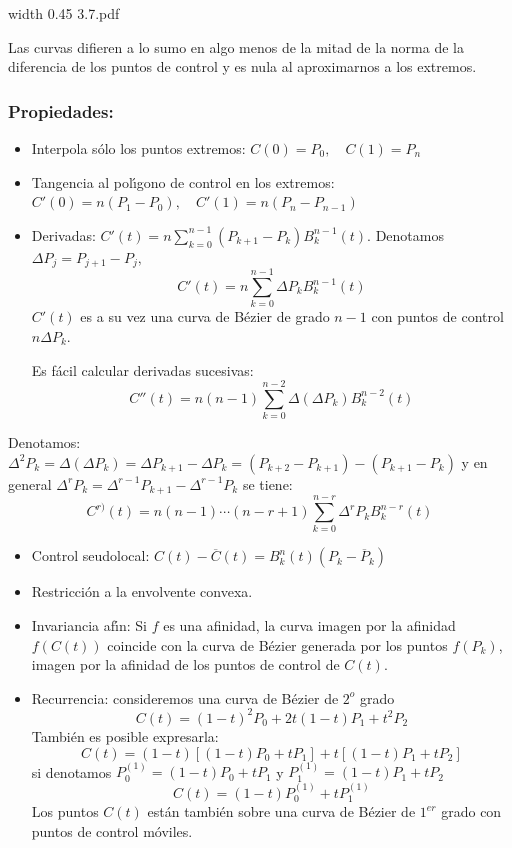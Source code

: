 \documentclass[twoside]{report}
\newcommand{\colocapdf}[2]{\quad\pdfimage width #2 {#1.pdf}}
\begin{document}
\vspace{0.3cm}

\begin{center}
\colocapdf{3.7}{0.45\textwidth}
\end{center}

Las curvas difieren a lo sumo en algo menos de la mitad de la norma de la diferencia de los puntos de control y es nula al aproximarnos a los extremos.

\subsubsection{Propiedades:}

\begin{itemize}
\item Interpola s\'{o}lo los puntos extremos: $C(0)=P_0,\quad C(1)=P_n$
\item Tangencia al pol\'{\i}gono de control en los extremos: $C'(0)=n(P_1-P_0),\quad C'(1)=n(P_n-P_{n-1})$
\item Derivadas: $C'(t)=n\sum_{k=0}^{n-1}(P_{k+1}-P_k)B_k^{n-1}(t).$ Denotamos $\Delta P_j=P_{j+1}-P_j,$
$$C'(t)=n\sum_{k=0}^{n-1}\Delta P_kB_k^{n-1}(t)$$ $C'(t)$ es a su vez una curva de B\'{e}zier de grado $n-1$ con puntos de control $n\Delta P_k.$

Es f\'{a}cil calcular derivadas sucesivas:
$$C''(t)=n(n-1)\sum_{k=0}^{n-2} \Delta(\Delta P_k)B_k^{n-2}(t)$$
\end{itemize}

Denotamos: $\Delta^2 P_k=\Delta(\Delta P_k)=\Delta P_{k+1}-\Delta P_k=(P_{k+2}-P_{k+1})-(P_{k+1}-P_k)$ y en general $\Delta^r P_k=\Delta^{r-1} P_{k+1}-\Delta^{r-1} P_k$ se tiene:
$$C^{r)}(t)=n(n-1)\cdots(n-r+1)\sum_{k=0}^{n-r} \Delta^r P_k B_k^{n-r}(t)$$

\begin{itemize}
\item Control seudolocal: $C(t)-\overline{C}(t)=B_k^n(t) (P_k-\overline{P}_k)$
\item  Restricci\'{o}n a la envolvente convexa. %
\item Invariancia af\'{\i}n: Si $f$ es una afinidad, la curva imagen por la afinidad $f(C(t))$ coincide con la curva de B\'{e}zier generada por los puntos $f(P_k)$, imagen por la afinidad de los puntos de control de $C(t)$.
\item Recurrencia:  consideremos una curva de B\'{e}zier de $2^{o}$ grado
$$C(t)=(1-t)^2 P_0+2t(1-t) P_1+t^2P_2$$
Tambi\'{e}n es posible expresarla:
$$C(t)=(1-t)[(1-t)P_0+tP_1]+t[(1-t)P_1+tP_2]$$
si denotamos $P_0^{(1)}=(1-t)P_0+tP_1$ \;y\; $P_1^{(1)}=(1-t)P_1+tP_2$
$$C(t)=(1-t)P_0^{(1)}+tP_1^{(1)}$$
Los puntos $C(t)$ est\'{a}n tambi\'{e}n sobre una curva de B\'{e}zier de $1^{er}$ grado con puntos de control m\'{o}viles.
\end{itemize}
\end{document}

